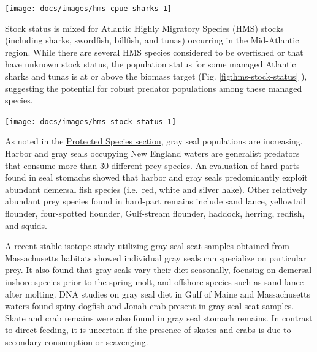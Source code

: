 \documentclass[
  10pt,
]{article}
\let\origfigure\figure
\let\endorigfigure\endfigure
\renewenvironment{figure}[1][2] {
    \expandafter\origfigure\expandafter[H]
} {
    \endorigfigure
}
\begin{document}
\begin{figure}

{\centering \texttt{[image: docs/images/hms-cpue-sharks-1]} 

}

\caption{Estimated number of sharks per unit effort from Highly Migratory Species Pelagic Observer Program data.}\label{fig:hms-cpue-sharks}
\end{figure}

Stock status is mixed for Atlantic Highly Migratory Species (HMS) stocks
(including sharks, swordfish, billfish, and tunas) occurring in the
Mid-Atlantic region. While there are several HMS species considered to
be overfished or that have unknown stock status, the population status
for some managed Atlantic sharks and tunas is at or above the biomass
target (Fig. \ref{fig:hms-stock-status} ), suggesting the potential for
robust predator populations among these managed species.

\begin{figure}

{\centering \texttt{[image: docs/images/hms-stock-status-1]} 

}

\caption{Summary of single species status for HMS stocks.}\label{fig:hms-stock-status}
\end{figure}

As noted in the \protect\hyperlink{protected-species}{Protected Species
section}, gray seal populations are increasing. Harbor and gray seals
occupying New England waters are generalist predators that consume more
than 30 different prey species. An evaluation of hard parts found in
seal stomachs showed that harbor and gray seals predominantly exploit
abundant demersal fish species (i.e.~red, white and silver hake). Other
relatively abundant prey species found in hard-part remains include sand
lance, yellowtail flounder, four-spotted flounder, Gulf-stream flounder,
haddock, herring, redfish, and squids.

A recent stable isotope study utilizing gray seal scat samples obtained
from Massachusetts habitats showed individual gray seals can specialize
on particular prey. It also found that gray seals vary their diet
seasonally, focusing on demersal inshore species prior to the spring
molt, and offshore species such as sand lance after molting. DNA studies
on gray seal diet in Gulf of Maine and Massachusetts waters found spiny
dogfish and Jonah crab present in gray seal scat samples. Skate and crab
remains were also found in gray seal stomach remains. In contrast to
direct feeding, it is uncertain if the presence of skates and crabs is
due to secondary consumption or scavenging.
\end{document}

